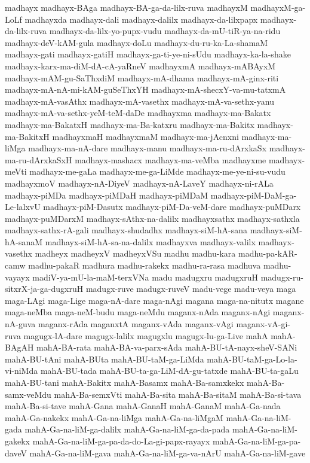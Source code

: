 {madhayx
madhayx-BAga
madhayx-BA-ga-da-lilx-ruva
madhayxM
madhayxM-ga-LoLf
madhayxda
madhayx-dali
madhayx-dalilx
madhayx-da-lilxpapx
madhayx-da-lilx-ruva
madhayx-da-lilx-yo-pupx-vudu
madhayx-da-mU-tiR-ya-na-ridu
madhayx-deV-kAM-gula
madhayx-doLu
madhayx-du-ru-ka-La-shamaM
madhayx-gati
madhayx-gatiH
madhayx-ga-ti-ye-ni-sUdu
madhayx-ka-la-shake
madhayx-karx-ma-diM-dA-cA-yaRneV
madhayxmA
madhayx-mABAyxM
madhayx-mAM-gu-SaThxdiM
madhayx-mA-dhama
madhayx-mA-ginx-riti
madhayx-mA-nA-mi-kAM-guSeThxYH
madhayx-mA-shecxY-va-mu-tatxmA
madhayx-mA-vasAthx
madhayx-mA-vasethx
madhayx-mA-va-sethx-yanu
madhayx-mA-va-sethx-yeM-teM-daDe
madhayxma
madhayx-ma-Bakatx
madhayx-ma-BakatxH
madhayx-ma-Ba-katxru
madhayx-ma-Bakitx
madhayx-ma-BakitxH
madhayxmaH
madhayxmaM
madhayx-ma-jAcnxni
madhayx-ma-liMga
madhayx-ma-nA-dare
madhayx-manu
madhayx-ma-ru-dArxkaSx
madhayx-ma-ru-dArxkaSxH
madhayx-mashacx
madhayx-ma-veMba
madhayxme
madhayx-meVti
madhayx-me-gaLa
madhayx-me-ga-LiMde
madhayx-me-ye-ni-su-vudu
madhayxmoV
madhayx-nA-DiyeV
madhayx-nA-LaveY
madhayx-ni-rALa
madhayx-piMDa
madhayx-piMDaH
madhayx-piMDaM
madhayx-piM-DaM-ga-Le-lalxvU
madhayx-piM-Dasutx
madhayx-piM-Da-veM-dare
madhayx-puMDarx
madhayx-puMDarxM
madhayx-sAthx-na-dalilx
madhayxsathx
madhayx-sathxla
madhayx-sathx-rA-gali
madhayx-shudadhx
madhayx-siM-hA-sana
madhayx-siM-hA-sanaM
madhayx-siM-hA-sa-na-dalilx
madhayxva
madhayx-valilx
madhayx-vasethx
madheyx
madheyxV
madheyxVSu
madhu
madhu-kara
madhu-pa-kAR-camw
madhu-pakaR
madhura
madhu-rakekx
madhu-ra-rasa
madhuva
madhu-vayayx
madiV-ya-mU-la-maM-terxVNa
madu
madugxru
madugxruH
madugx-ru-sitxrX-ja-ga-dugxruH
madugx-ruve
madugx-ruveV
madu-vege
madu-veya
maga
maga-LAgi
maga-Lige
maga-nA-dare
maga-nAgi
magana
maga-na-nitutx
magane
maga-neMba
maga-neM-budu
maga-neMdu
maganx-nAda
maganx-nAgi
maganx-nA-guva
maganx-rAda
maganxtA
maganx-vAda
maganx-vAgi
maganx-vA-gi-ruva
magugx-lA-dare
magugx-lalilx
magugxlu
magugx-lu-ga-Live
mahA
mahA-BAgAH
mahA-BA-rata
mahA-BA-va-parx-sAda
mahA-BU-tA-nayx-sheV-SANi
mahA-BU-tAni
mahA-BUta
mahA-BU-taM-ga-LiMda
mahA-BU-taM-ga-Lo-la-vi-niMda
mahA-BU-tada
mahA-BU-ta-ga-LiM-dA-gu-tatxde
mahA-BU-ta-gaLu
mahA-BU-tani
mahA-Bakitx
mahA-Basamx
mahA-Ba-samxkekx
mahA-Ba-samx-veMdu
mahA-Ba-semxVti
mahA-Ba-sita
mahA-Ba-sitaM
mahA-Ba-si-tava
mahA-Ba-si-tave
mahA-Gana
mahA-GanaH
mahA-GanaM
mahA-Ga-nada
mahA-Ga-nakekx
mahA-Ga-na-liMga
mahA-Ga-na-liMgaM
mahA-Ga-na-liM-gada
mahA-Ga-na-liM-ga-dalilx
mahA-Ga-na-liM-ga-da-pada
mahA-Ga-na-liM-gakekx
mahA-Ga-na-liM-ga-pa-da-do-La-gi-papx-rayayx
mahA-Ga-na-liM-ga-pa-daveV
mahA-Ga-na-liM-gava
mahA-Ga-na-liM-ga-va-nArU
mahA-Ga-na-liM-gave
}
